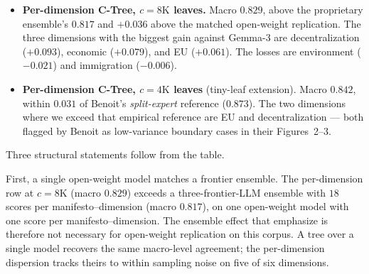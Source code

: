 \begin{itemize}[leftmargin=1.5em]
    \item \textbf{Per-dimension C-Tree, $c = 8\mathrm{K}$ leaves.}
          Macro $0.829$, above the proprietary ensemble's $0.817$ and
          $+0.036$ above the matched open-weight replication. The
          three dimensions with the biggest gain against Gemma-3
          are decentralization ($+0.093$), economic ($+0.079$), and
          EU ($+0.061$). The losses are environment ($-0.021$) and
          immigration ($-0.006$).
    \item \textbf{Per-dimension C-Tree, $c = 4\mathrm{K}$ leaves}
          (tiny-leaf extension). Macro $0.842$, within $0.031$ of
          Benoit's \emph{split-expert} reference ($0.873$). The
          two dimensions where we exceed that empirical reference are
          EU and decentralization --- both flagged by Benoit as
          low-variance boundary cases in their Figures~2--3.
\end{itemize}

\begin{table}[t]
    \centering
    \resizebox{\linewidth}{!}{}
    \caption{Pearson $r$ against Benoit expert-survey means across six
    policy dimensions. The first block reproduces
    \citet{BenoitEtAl2025}'s published numbers (Fig.~1 proprietary
    ensemble, Tab.~3 split-expert reference, Tab.~6 open-weight
    replication at Gemma-3-27B). The Table~3 row is an empirical
    agreement reference, not a theoretical limit. The remaining
    blocks are C-TreePO on Gemma-4-31B-NVFP4 across chunk sizes $c$,
    under the per-dimension
    and joint variants. The macro column is the unweighted mean
    across dimensions for each row. Full per-cell table with
    coverage, ablations, and compute accounting appears in
    Appendix~\ref{app:benoit-replication}.}\label{tab:benoit-headline}
\end{table}

Three structural statements follow from the table.

First, a single open-weight model matches a frontier ensemble. The per-dimension row at $c = 8\mathrm{K}$ (macro $0.829$) exceeds a three-frontier-LLM ensemble with $18$ scores per manifesto--dimension (macro $0.817$), on one open-weight model with one score per manifesto--dimension. The ensemble effect that \citet{BenoitEtAl2025} emphasize is therefore not necessary for open-weight replication on this corpus. A tree over a single model recovers the same macro-level agreement; the per-dimension dispersion tracks theirs to within sampling noise on five of six dimensions.

